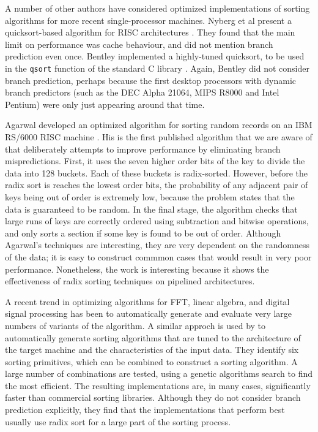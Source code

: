 \documentclass[acmtocl]{acmtrans2m}
\begin{document}
A number of other authors have considered optimized implementations of
sorting algorithms for more recent single-processor machines. Nyberg
et al present a quicksort-based algorithm for RISC architectures
\cite{Nyberg+94}. They found that the main limit on performance was
cache behaviour, and did not mention branch prediction even
once. Bentley implemented a highly-tuned quicksort, to be used in the
\texttt{qsort} function of the standard C library
\cite{Bentley93}. Again, Bentley did not consider branch prediction,
perhaps because the first desktop processors with dynamic branch
predictors (such as the DEC Alpha 21064, MIPS R8000 and Intel Pentium)
were only just appearing around that time.

Agarwal developed an optimized algorithm for sorting random records on
an IBM RS/6000 RISC machine \cite{Agarwal96}. His is the first
published algorithm that we are aware of that deliberately attempts to
improve performance by eliminating branch mispredictions. First, it
uses the seven higher order bits of the key to divide the data into
128 buckets. Each of these buckets is radix-sorted. However, before
the radix sort is reaches the lowest order bits, the probability of
any adjacent pair of keys being out of order is extremely low, because
the problem states that the data is guaranteed to be random. In the
final stage, the algorithm checks that large runs of keys are
correctly ordered using subtraction and bitwise operations, and only
sorts a section if some key is found to be out of order. Although
Agarwal's techniques are interesting, they are very dependent on the
randomness of the data; it is easy to construct commmon cases that
would result in very poor performance. Nonetheless, the work is
interesting because it shows the effectiveness of radix sorting
techniques on pipelined architectures.

A recent trend in optimizing algorithms for FFT, linear algebra, and
digital signal processing has been to automatically generate and
evaluate very large numbers of variants of the algorithm.  A similar
approch is used by \cite{Li+05} to automatically generate sorting
algorithms that are tuned to the architecture of the target machine
and the characteristics of the input data. They identify six sorting
primitives, which can be combined to construct a sorting algorithm.  A
large number of combinations are tested, using a genetic algorithms
search to find the most efficient. The resulting implementations are,
in many cases, significantly faster than commercial sorting libraries.
Although they do not consider branch prediction explicitly, they find
that the implementations that perform best usually use radix sort for
a large part of the sorting process.
\end{document}
